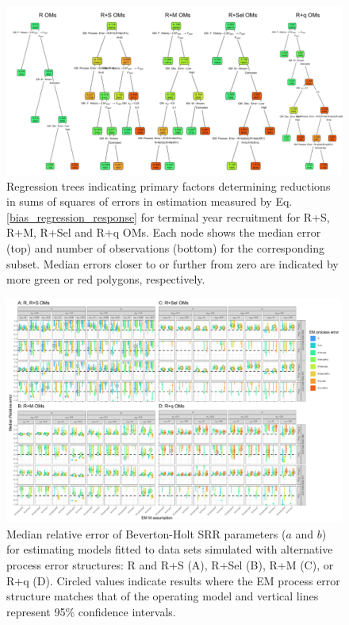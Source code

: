 \documentclass[
  12pt,
]{article}
\begin{document}
\begin{landscape}
\begin{figure}
\begin{center}
\includegraphics[width = 1.4\textwidth]{R_bias_regtree_plots}
\end{center}
\caption{Regression trees indicating primary factors determining reductions in sums of squares of errors in estimation measured by Eq. \ref{bias_regression_response} for terminal year recruitment for R+S, R+M, R+Sel and R+q OMs. Each node shows the median error (top) and number of observations (bottom) for the corresponding subset. Median errors closer to or further from zero are indicated by more green or red polygons, respectively.}\label{R_bias_regtree}
\end{figure}
\end{landscape}

\begin{landscape}
\begin{figure}
\begin{center}
\includegraphics[width = 1.4\textwidth]{sr_bias_plots}
\end{center}
\caption{Median relative error of Beverton-Holt SRR parameters ($a$ and $b$) for estimating models fitted to data sets simulated with alternative process error structures: R and R+S (A), R+Sel (B), R+M (C), or R+q (D). Circled values indicate results where the EM process error structure matches that of the operating model and vertical lines represent 95\% confidence intervals.}\label{SR_rel_error}
\end{figure}
\end{landscape}
\end{document}
